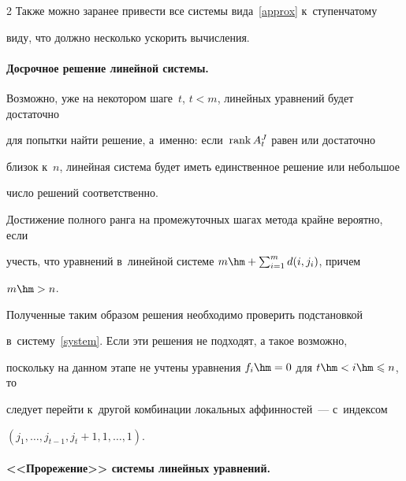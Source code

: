 \begin{multicols}{2}
Также можно заранее привести все системы вида~\eqref{approx} к~ступенчатому 


виду, что должно несколько ускорить вычисления.








\vspace*{-12pt}





\paragraph*{Досрочное решение линейной системы.}


Возможно, уже на некотором шаге~$t$, $t<m$, линейных уравнений будет достаточно 


для попытки найти решение, а~именно: если~$\mathrm{rank}\, A^{J}_t$ равен или достаточно 


близок к~$n$, линейная система будет иметь единственное решение или небольшое 


число решений соответственно.


Достижение полного ранга на промежуточных шагах метода крайне вероятно, если 


учесть, что уравнений в~линейной системе $m\hm+\sum\nolimits_{i=1}^m d(i,j_i)$, причем 


$m\hm>n$.





Полученные таким образом решения необходимо проверить подстановкой 


в~систему~\eqref{system}. Если эти решения не подходят, а такое возможно, 


поскольку на данном этапе не учтены уравнения $f_i\hm=0$ для $t\hm<i\hm\leqslant n$, то 


следует перейти к~другой комбинации локальных аффинностей~--- с~индексом 


$(j_1,\ldots,j_{t-1},j_t+1,1,\ldots,1)$.





\vspace*{-12pt}





\paragraph*{<<Прорежение>> системы линейных уравнений.}



\end{multicols}
